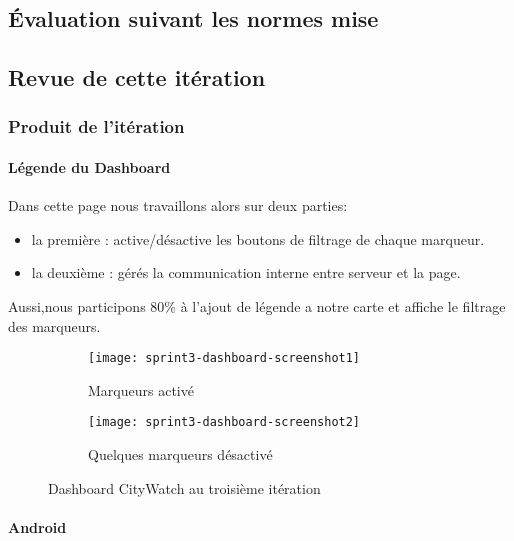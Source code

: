 \subsection{Évaluation suivant les normes mise}


\subsection{Revue de cette itération}


\subsubsection{Produit de l'itération}

\paragraph{Légende du Dashboard}
Dans cette page nous travaillons alors sur deux parties:

\begin{itemize}
 \item la première : active/désactive les boutons de filtrage de chaque marqueur.
 \item la deuxième : gérés la communication interne entre serveur et la page.
 \end{itemize}

Aussi,nous participons 80\% à l'ajout de légende a notre carte
et affiche le filtrage des marqueurs.

\begin{figure}[htbp]
\centering
    \begin{subfigure}{.8\textwidth}
    \centering
  \centering
  \texttt{[image: sprint3-dashboard-screenshot1]}
  \caption{Marqueurs activé}
  \label{fig:sprint3-dashboard-screenshot1}
\end{subfigure}
\begin{subfigure}{.8\textwidth}
    \centering
  \centering
  \texttt{[image: sprint3-dashboard-screenshot2]}
  \caption{Quelques marqueurs désactivé}
  \label{sprint3-dashboard-screenshot2}
\end{subfigure}
\caption{Dashboard CityWatch au troisième itération}
\end{figure}
\clearpage

\paragraph{Android}

